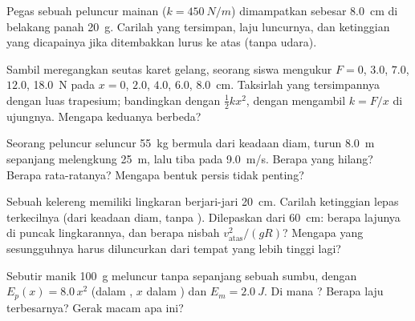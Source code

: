 \begin{exercise}[$\star\star$]\label{exo:g12:work-and-energy:6}
Pegas sebuah peluncur mainan ($k = \qty{450}{N/m}$) dimampatkan sebesar
\qty{8.0}{cm} di belakang panah \qty{20}{g}. Carilah  yang tersimpan,
laju luncurnya, dan ketinggian yang dicapainya jika ditembakkan lurus ke atas (tanpa udara).
\end{exercise}

\begin{exercise}[$\star\star$]\label{exo:g12:work-and-energy:7}
Sambil meregangkan seutas karet gelang, seorang siswa mengukur $F = 0$, $3.0$, $7.0$,
$12.0$, \qty{18.0}{N} pada $x = 0$, $2.0$, $4.0$, $6.0$, \qty{8.0}{cm}.
Taksirlah  yang tersimpannya dengan luas trapesium; bandingkan dengan
$\tfrac12 kx^2$, dengan mengambil $k = F/x$ di ujungnya. Mengapa keduanya berbeda?
\end{exercise}

\begin{exercise}[$\star\star$]\label{exo:g12:work-and-energy:8}
Seorang peluncur seluncur \qty{55}{kg} bermula dari keadaan diam, turun \qty{8.0}{m}
sepanjang  melengkung \qty{25}{m}, lalu tiba pada \qty{9.0}{m/s}. Berapa  yang hilang? Berapa   rata-ratanya? Mengapa bentuk persis  tidak penting?
\end{exercise}

\begin{exercise}[$\star\star$]\label{exo:g12:work-and-energy:9}
Sebuah  kelereng memiliki lingkaran berjari-jari \qty{20}{cm}. Carilah ketinggian
lepas terkecilnya (dari keadaan diam, tanpa ). Dilepaskan dari \qty{60}{cm}:
berapa lajunya di puncak lingkarannya, dan berapa nisbah $v_{\text{atas}}^2/(gR)$? Mengapa
 yang sesungguhnya harus diluncurkan dari tempat yang lebih tinggi lagi?
\end{exercise}

\begin{exercise}[$\star\star$]\label{exo:g12:work-and-energy:10}
Sebutir manik \qty{100}{g} meluncur tanpa  sepanjang sebuah sumbu, dengan
$E_p(x) = 8.0\,x^2$ (dalam , $x$ dalam ) dan $E_m = \qty{2.0}{J}$.
Di mana ? Berapa laju terbesarnya? Gerak macam apa ini?
\end{exercise}

